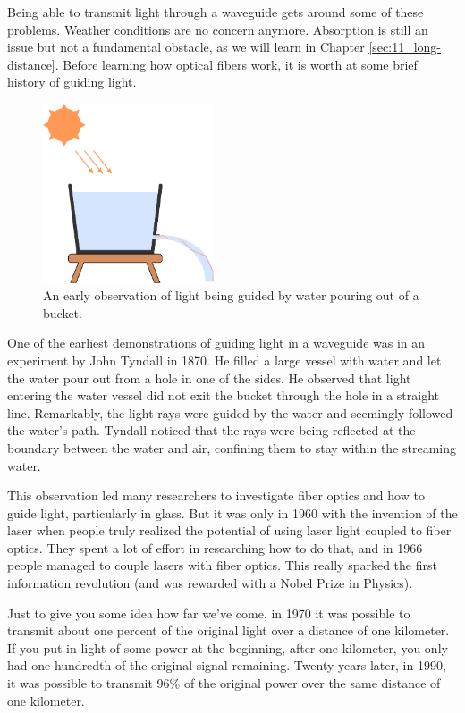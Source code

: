 Being able to transmit light through a waveguide gets around some of these problems.
Weather conditions are no concern anymore.
Absorption is still an issue but not a fundamental obstacle, as we will learn in Chapter \ref{sec:11_long-distance}.
Before learning how optical fibers work, it is worth at some brief history of guiding light.

\begin{figure}[t]
    \centering
    \includegraphics[width=0.45\textwidth]{lesson7/7-1_tyndall.pdf}
    \caption[Tyndall's experiment]{An early observation of light being guided by water pouring out of a bucket.}
    \label{fig:7-1_tyndall}
\end{figure}

One of the earliest demonstrations of guiding light in a waveguide was in an experiment by John Tyndall in 1870.
He filled a large vessel with water and let the water pour out from a hole in one of the sides.
He observed that light entering the water vessel did not exit the bucket through the hole in a straight line.
Remarkably, the light rays were guided by the water and seemingly followed the water's path.
Tyndall noticed that the rays were being reflected at the boundary between the water and air, confining them to stay within the streaming water.

This observation led many researchers to investigate fiber optics and how to guide light, particularly in glass.
But it was only in 1960 with the invention of the laser when people truly realized the potential of using laser light coupled to fiber optics.
They spent a lot of effort in researching how to do that, and in 1966 people managed to couple lasers with fiber optics.
This really sparked the first information revolution (and was rewarded with a Nobel Prize in Physics).

Just to give you some idea how far we've come, in 1970 it was possible to transmit about one percent of the original light over a distance of one kilometer.
If you put in light of some power at the beginning, after one kilometer, you only had one hundredth of the original signal remaining.
Twenty years later, in 1990, it was possible to transmit 96\% of the original power over the same distance of one kilometer.

